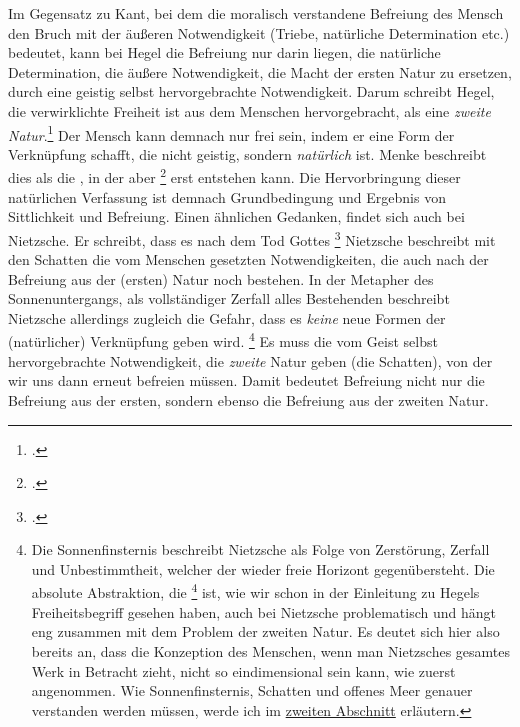 \documentclass[12pt, a4paper, openany]{report}
\begin{document}
Im Gegensatz zu Kant, bei dem die moralisch verstandene Befreiung des Mensch den Bruch mit der äußeren Notwendigkeit (Triebe, natürliche Determination etc.) bedeutet, kann bei Hegel die Befreiung nur darin liegen, die natürliche Determination, die äußere Notwendigkeit, die Macht der ersten Natur zu ersetzen, durch eine geistig selbst hervorgebrachte Notwendigkeit.
Darum schreibt Hegel, die verwirklichte Freiheit ist aus dem Menschen hervorgebracht, als eine \emph{zweite Natur}.\footcite[Vlg.][§4, S. 34.]{hegel_grundlinien_2017}
Der Mensch kann demnach nur frei sein, indem er eine Form der Verknüpfung schafft, die nicht geistig, sondern \emph{natürlich} ist. 
Menke beschreibt dies als die , in der aber \footcite[][40. Hervorhebung von mir]{menke_autonomie_2018} erst entstehen kann.
Die Hervorbringung dieser natürlichen Verfassung ist demnach Grundbedingung und Ergebnis von Sittlichkeit und Befreiung.
Einen ähnlichen Gedanken, findet sich auch bei Nietzsche. Er schreibt, dass es nach dem Tod Gottes \footcite[][§108, S. 467.]{nietzsche_morgenrote_1999}
Nietzsche beschreibt mit den Schatten die vom Menschen gesetzten Notwendigkeiten, die auch nach der Befreiung aus der (ersten) Natur noch bestehen. 
In der Metapher des Sonnenuntergangs, als vollständiger Zerfall alles Bestehenden beschreibt Nietzsche allerdings zugleich die Gefahr, dass es \emph{keine} neue Formen der (natürlicher) Verknüpfung geben wird.%
\footnote{
    Die Sonnenfinsternis beschreibt Nietzsche als Folge von Zerstörung, Zerfall und Unbestimmtheit, welcher der wieder freie Horizont gegenübersteht. 
    Die absolute Abstraktion, die \footcite[][§5, S. 39.]{hegel_grundlinien_2017} ist, wie wir schon in der Einleitung zu Hegels Freiheitsbegriff gesehen haben, auch bei Nietzsche problematisch und hängt eng zusammen mit dem Problem der zweiten Natur.
    Es deutet sich hier also bereits an, dass die Konzeption des  Menschen, wenn man Nietzsches gesamtes Werk in Betracht zieht, nicht so eindimensional sein kann, wie zuerst angenommen.
    Wie Sonnenfinsternis, Schatten und offenes Meer genauer verstanden werden müssen, werde ich im \hyperref[abschnitt_2]{zweiten Abschnitt} erläutern.
}
Es muss die vom Geist selbst hervorgebrachte Notwendigkeit, die \emph{zweite} Natur geben (die Schatten), von der wir uns dann erneut befreien müssen.
Damit bedeutet Befreiung nicht nur die Befreiung aus der ersten, sondern ebenso die Befreiung aus der zweiten Natur. 
\end{document}
